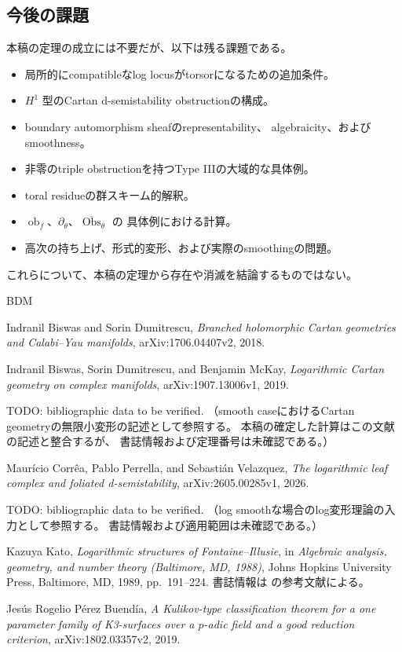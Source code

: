 \documentclass[uplatex,dvipdfmx,11pt]{jsarticle}
\numberwithin{equation}{section}
\theoremstyle{plain}
\theoremstyle{definition}
\theoremstyle{remark}
\DeclareMathOperator{\Obs}{Obs}
\DeclareMathOperator{\obf}{ob}
\begin{document}
\subsection{今後の課題}

本稿の定理の成立には不要だが、以下は残る課題である。
\begin{itemize}
\item 局所的にcompatibleなlog locusがtorsorになるための追加条件。
\item \(H^1\) 型のCartan d-semistability obstructionの構成。
\item boundary automorphism sheafのrepresentability、
algebraicity、およびsmoothness。
\item 非零のtriple obstructionを持つType IIIの大域的な具体例。
\item toral residueの群スキーム的解釈。
\item \(\obf_f\)、\(\partial_\theta\)、\(\overline{\Obs}_\theta\) の
具体例における計算。
\item 高次の持ち上げ、形式的変形、および実際のsmoothingの問題。
\end{itemize}
これらについて、本稿の定理から存在や消滅を結論するものではない。

\begin{thebibliography}{BDM}

Indranil Biswas and Sorin Dumitrescu,
\emph{Branched holomorphic Cartan geometries and Calabi--Yau manifolds},
arXiv:1706.04407v2, 2018.

Indranil Biswas, Sorin Dumitrescu, and Benjamin McKay,
\emph{Logarithmic Cartan geometry on complex manifolds},
arXiv:1907.13006v1, 2019.

TODO: bibliographic data to be verified.
（smooth caseにおけるCartan geometryの無限小変形の記述として参照する。
本稿の確定した計算はこの文献の記述と整合するが、
書誌情報および定理番号は未確認である。）

Maur\'icio Corr\^ea, Pablo Perrella, and Sebasti\'an Velazquez,
\emph{The logarithmic leaf complex and foliated d-semistability},
arXiv:2605.00285v1, 2026.

TODO: bibliographic data to be verified.
（log smoothな場合のlog変形理論の入力として参照する。
書誌情報および適用範囲は未確認である。）

Kazuya Kato,
\emph{Logarithmic structures of Fontaine--Illusie},
in \emph{Algebraic analysis, geometry, and number theory
(Baltimore, MD, 1988)},
Johns Hopkins University Press, Baltimore, MD, 1989, pp.~191--224.
書誌情報は \cite{PB} の参考文献による。

Jes\'us Rogelio P\'erez Buend\'ia,
\emph{A Kulikov-type classification theorem for a one parameter family
of K3-surfaces over a \(p\)-adic field and a good reduction criterion},
arXiv:1802.03357v2, 2019.

\end{thebibliography}
\end{document}
